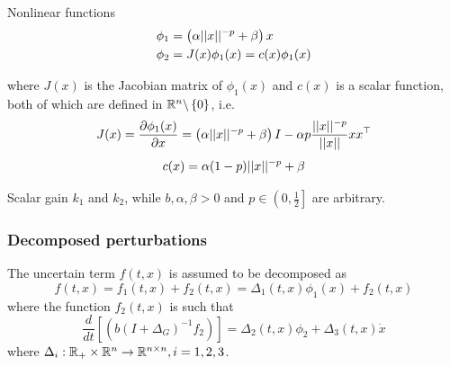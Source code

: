 Nonlinear functions
\begin{align}
    \phi_1 &= \left(\alpha\lvert\lvert x\rvert\rvert^{-p}+\beta\right)x \label{eq:moreno-phi_1}\\
    \phi_2 &= J(x)\phi_1(x) = c(x)\phi_1(x) \label{eq:moreno-phi_2}
\end{align}

where $J(x)$ is the Jacobian matrix of $\phi_1(x)$ and $c(x)$ is a scalar function, both of which are defined in $\mathbb{R}^n \backslash \left\{0\right\}$, i.e.
\begin{equation}
    J(x) = \frac{\partial\phi_1(x)}{\partial x} = \left(\alpha\lvert\lvert x\rvert\rvert^{-p}+\beta\right)I - \alpha p \frac{\lvert\lvert x\rvert\rvert^{-p}}{\lvert\lvert x\rvert\rvert}xx^\top
\end{equation}
\begin{equation}
    c(x) = \alpha(1 - p)\lvert\lvert x\rvert\rvert^{-p} + \beta
\end{equation}

Scalar gain $k_1$ and $k_2$, while $b, \alpha, \beta >0$ and $p \in \left(0, \frac{1}{2}\right]$ are arbitrary. 

\subsubsection{Decomposed perturbations}
The uncertain term $f(t,x)$ is assumed to be decomposed as
\begin{equation}
    f(t, x) = f_1(t,x) + f_2(t,x) = \Delta_1(t,x)\phi_1(x) + f_2(t,x)
    \label{eq:moreno-eq-10}
\end{equation}
where the function $f_2(t,x)$ is such that
\begin{equation}
    \frac{d}{dt}\left[\left(b\left(I + \Delta_G\right)^{-1}f_2\right)\right] = \Delta_2(t,x)\phi_2 + \Delta_3(t,x)\dot{x}
    \label{eq:moreno-eq-11}
\end{equation}
where $\Delta_i : \mathbb{R}_+ \times \mathbb{R}^n \rightarrow \mathbb{R}^{n \times n}, i=1,2,3$.

